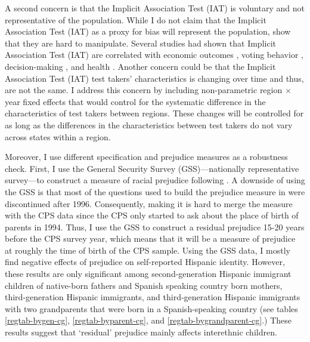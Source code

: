 \documentclass[12pt, fullpage]{article}
\begin{document}


A second concern is that the Implicit Association Test (IAT) is voluntary and not representative of the population. While I do not claim that the Implicit Association Test (IAT) as a proxy for bias will represent the population, \citet{egloffPredictiveValidityImplicit2002} show that they are hard to manipulate. Several studies had shown that Implicit Association Test (IAT) are correlated with economic outcomes \citep{chettyRaceEconomicOpportunity2020,gloverDiscriminationSelfFulfillingProphecy2017}, voting behavior \citep{friesePredictingVotingBehavior2007}, decision-making \citep{bertrandImplicitDiscrimination2005,carlanaImplicitStereotypesEvidence2019}, and health \citep{leitnerRacialBiasAssociated2016}. Another concern could be that the Implicit Association Test (IAT) test takers' characteristics is changing over time and thus, are not the same. I address this concern by including non-parametric region $\times$ year fixed effects that would control for the systematic difference in the characteristics of test takers between regions. These changes will be controlled for as long as the differences in the characteristics between test takers do not vary across states within a region. 

Moreover, I use different specification and prejudice measures as a robustness check. First, I use the General Security Survey (GSS)---nationally representative survey---to construct a measure of racial prejudice following \citet{charlesPrejudiceWagesEmpirical2008}. A downside of using the GSS is that most of the questions used to build the prejudice measure in \citet{charlesPrejudiceWagesEmpirical2008} were discontinued after 1996. Consequently, making it is hard to merge the measure with the CPS data since the CPS only started to ask about the place of birth of parents in 1994. Thus, I use the GSS to construct a residual prejudice 15-20 years before the CPS survey year, which means that it will be a measure of prejudice at roughly the time of birth of the CPS sample. Using the GSS data, I mostly find negative effects of prejudice on self-reported Hispanic identity. However, these results are only significant among second-generation Hispanic immigrant children of native-born fathers and Spanish speaking country born mothers, third-generation Hispanic immigrants, and third-generation Hispanic immigrants with two grandparents that were born in a Spanish-speaking country (see tables \ref{regtab-bygen-cg}, \ref{regtab-byparent-cg}, and \ref{regtab-bygrandparent-cg}.) These results suggest that `residual' prejudice mainly affects interethnic children. 
\end{document}
